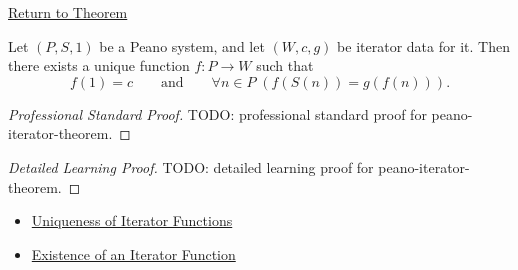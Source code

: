 \newpage
{}
\label{prf:peano-iterator-theorem}

\begin{remark*}[Return]
\hyperref[thm:peano-iterator-theorem]{Return to Theorem}
\end{remark*}

\begin{theorem*}
Let $(P,S,1)$ be a Peano system, and let $(W,c,g)$ be iterator data for it.
Then there exists a unique function $f:P\to W$ such that
\[
f(1)=c
\qquad\text{and}\qquad
\forall n\in P\;(f(S(n))=g(f(n))).
\]
\end{theorem*}

\begin{proof}[Professional Standard Proof]
\LRAProofBodyStart
TODO: professional standard proof for peano-iterator-theorem.
\end{proof}

\begin{proof}[Detailed Learning Proof]
\LRAProofBodyStart
TODO: detailed learning proof for peano-iterator-theorem.
\end{proof}

\begin{remark*}
\end{remark*}

\begin{dependencies}
\begin{itemize}
  \item \hyperref[lem:uniqueness-of-iterator-functions]{Uniqueness of Iterator Functions}
  \item \hyperref[lem:existence-of-iterator-function]{Existence of an Iterator Function}
\end{itemize}
\end{dependencies}

\clearpage
